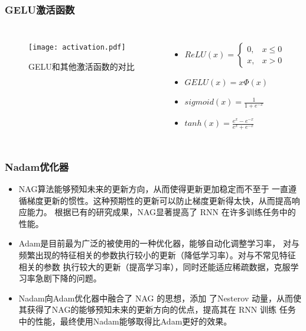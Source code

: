 \documentclass[14pt, AutoFakeBold]{ppt}
\begin{document}
\begin{frame}
  \frametitle{GELU激活函数}
  \begin{columns}
    \begin{figure}[H]
      \centering
      \texttt{[image: activation.pdf]}
      \caption{GELU和其他激活函数的对比}
      \label{fig_activation}
    \end{figure}
      \begin{itemize}
      \item $ReLU(x)=\left\{\begin{matrix}
          0, & x \leq 0 \\
          x, & x > 0
      \end{matrix}\right.$
      \item $GELU(x)=x\Phi(x)$
      \item $sigmoid(x)=\frac{1}{1+e^{-x}}$
      \item $tanh(x)=\frac{e^x-e^{-x}}{e^x+e^{-x}}$
    \end{itemize}
  \end{columns}
\end{frame}

\begin{frame}
  \frametitle{Nadam优化器}
  \begin{itemize}
    \item NAG\cite{nesterov1983method}算法能够预知未来的更新方向，从而使得更新更加稳定而不至于
一直遵循梯度更新的惯性。这种预期性的更新可以防止梯度更新得太快，从而提高响应能力。
根据已有的研究成果，NAG显著提高了 RNN 在许多训练任务中的性能\cite{bengio2013advances}。
    \item Adam\cite{kingma2014adam}是目前最为广泛的被使用的一种优化器，能够自动化调整学习率，
对与频繁出现的特征相关的参数执行较小的更新（降低学习率）。对与不常见特征相关的参数
执行较大的更新（提高学习率），同时还能适应稀疏数据，克服学习率急剧下降的问题。
    \item Nadam\cite{dozat2016incorporating}向Adam优化器中融合了 NAG 的思想，添加
了Nesterov 动量，从而使其获得了NAG的能够预知未来的更新方向的优点，提高其在 RNN 训练
任务中的性能，最终使用Nadam能够取得比Adam更好的效果。
\end{itemize}
\end{frame}
\end{document}
